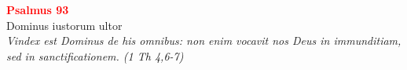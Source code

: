 


\def\greinitialformat#1{%
{\fontsize{39}{39}\selectfont #1}%
}




\vspace{0.3cm}
\begin{center}
 \textcolor{red}{\large \bf Psalmus 93}\\
Dominus iustorum ultor\\
\textit{\small Vindex est Dominus de his omnibus: non enim vocavit nos Deus in immunditiam, sed in sanctificationem. (1 Th 4,6-7)}
\end{center}
